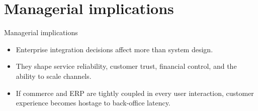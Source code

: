 \documentclass[aspectratio=169]{beamer}
\begin{document}
\section{Managerial implications}

\begin{frame}{Managerial implications}
  \begin{itemize}
    \item Enterprise integration decisions affect more than system design.
    \item They shape service reliability, customer trust, financial control, and the ability to scale channels.
    \item If commerce and ERP are tightly coupled in every user interaction, customer experience becomes hostage to back-office latency.
  \end{itemize}
\end{frame}
\end{document}
